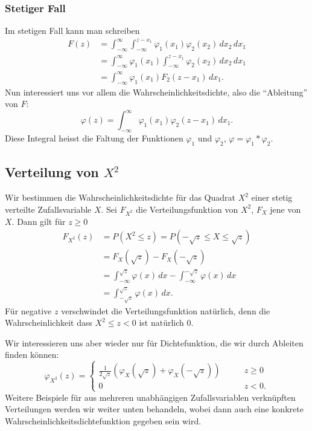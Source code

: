 \subsubsection{Stetiger Fall}
Im stetigen Fall kann man schreiben
\begin{align*}
F(z)&=\int_{-\infty}^{\infty}\int_{-\infty}^{z-x_1}\varphi_1(x_1)\varphi_2(x_2)
\,dx_2\,dx_1\\
&=\int_{-\infty}^{\infty}
\varphi_1(x_1)
\int_{-\infty}^{z-x_1}
\varphi_2(x_2)
\,dx_2\,dx_1\\
&=\int_{-\infty}^{\infty}
\varphi_1(x_1)
F_2(z-x_1)
\,dx_1.
\end{align*}
Nun interessiert uns vor allem die Wahrscheinlichkeitsdichte, also die
``Ableitung'' von $F$:
\[
\varphi(z)=\int_{-\infty}^{\infty}\varphi_1(x_1)\varphi_2(z-x_1)\,dx_1.
\]
Diese Integral heisst die Faltung der Funktionen $\varphi_1$ und $\varphi_2$,
$\varphi=\varphi_1*\varphi_2$.

\subsection{Verteilung von \texorpdfstring{$X^2$}{X hoch 2}}
Wir bestimmen die Wahrscheinlichkeitsdichte für das Quadrat 
$X^2$ einer stetig verteilte Zufallsvariable $X$.
Sei $F_{X^2}$ die Verteilungsfunktion von $X^2$, $F_X$ jene von $X$.
Dann gilt für $z\ge 0$
\begin{align*}
F_{X^2}(z)&=P(X^2\le z)=P(-\sqrt{z}\le X\le \sqrt{z})\\
&=F_X(\sqrt{z})-F_X(-\sqrt{z})\\
&=\int_{-\infty}^{\sqrt{z}}\varphi(x)\,dx-\int_{-\infty}^{-\sqrt{z}}\varphi(x)\,dx\\
&=\int_{-\sqrt{z}}^{\sqrt{z}}\varphi(x)\,dx.
\end{align*}
Für negative $z$ verschwindet die Verteilungsfunktion natürlich, denn
die Wahrscheinlichkeit dass $X^2\le z <0$ ist natürlich 0.

Wir interessieren uns aber wieder nur für Dichtefunktion, die wir
durch Ableiten finden können:
\[
\varphi_{X^2}(z)=\begin{cases}
\frac{1}{2\sqrt{z}}\left(\varphi_X(\sqrt{z})+\varphi_X(-\sqrt{z})\right)&\qquad z\ge 0\\
0&\qquad z<0.
\end{cases}
\]
Weitere Beispiele für aus mehreren unabhängigen Zufallsvariablen
verknüpften Verteilungen werden wir weiter unten behandeln, wobei
dann auch eine konkrete Wahrscheinlichkeitsdichtefunktion gegeben sein
wird.

